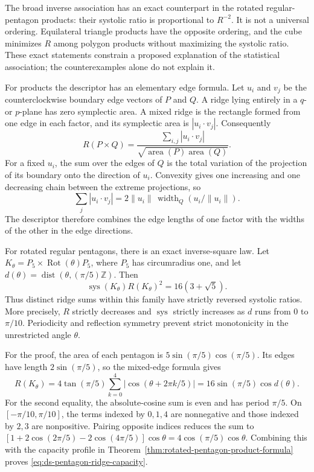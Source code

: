 The broad inverse association has an exact counterpart in the rotated
regular-pentagon products: their systolic ratio is proportional to
$R^{-2}$. It is not a universal ordering. Equilateral triangle products
have the opposite ordering, and the cube minimizes $R$ among polygon
products without maximizing the systolic ratio. These exact statements
constrain a proposed explanation of the statistical association; the
counterexamples alone do not explain it.

For products the descriptor has an elementary edge formula. Let $u_i$ and $v_j$ be
the counterclockwise boundary edge vectors of $P$ and $Q$. A ridge lying entirely in a $q$-
or $p$-plane has zero symplectic area. A mixed ridge is the rectangle formed
from one edge in each factor, and its symplectic area is $|u_i\cdot v_j|$.
Consequently
\[
 R(P\times Q)=\frac{\sum_{i,j}|u_i\cdot v_j|}
                    {\sqrt{\operatorname{area}(P)\operatorname{area}(Q)}}.
\]
For a fixed $u_i$, the sum over the edges of $Q$ is the total variation of
the projection of its boundary onto the direction of $u_i$. Convexity gives
one increasing and one decreasing chain between the extreme projections,
so
\[
 \sum_j|u_i\cdot v_j|
 =2\|u_i\|\,\operatorname{width}_Q(u_i/\|u_i\|).
\]
The descriptor therefore combines the edge lengths of one factor with the
widths of the other in the edge directions.


For rotated regular pentagons, there is an exact inverse-square law. Let
$K_\theta=P_5\times\operatorname{Rot}(\theta)P_5$, where $P_5$ has
circumradius one, and let $d(\theta)=\operatorname{dist}(\theta,(\pi/5)\mathbb Z)$.
Then
\begin{equation}\label{eq:ds-pentagon-ridge-capacity}
 \operatorname{sys}(K_\theta)R(K_\theta)^2=16(3+\sqrt5).
\end{equation}
Thus distinct ridge sums within this family have strictly reversed
systolic ratios. More precisely, $R$ strictly decreases and
$\operatorname{sys}$ strictly increases as $d$ runs from $0$ to $\pi/10$.
Periodicity and reflection symmetry prevent strict monotonicity in the
unrestricted angle $\theta$.

For the proof, the area of each pentagon is $5\sin(\pi/5)\cos(\pi/5)$.
Its edges have length $2\sin(\pi/5)$, so the mixed-edge formula gives
\[
 R(K_\theta)=4\tan(\pi/5)\sum_{k=0}^4|\cos(\theta+2\pi k/5)|
           =16\sin(\pi/5)\cos d(\theta).
\]
For the second equality, the absolute-cosine sum is even and has period
$\pi/5$. On $[-\pi/10,\pi/10]$, the terms indexed by $0,1,4$ are
nonnegative and those indexed by $2,3$ are nonpositive. Pairing opposite
indices reduces the sum to
$[1+2\cos(2\pi/5)-2\cos(4\pi/5)]\cos\theta
=4\cos(\pi/5)\cos\theta$. Combining this with the capacity profile in
Theorem~\ref{thm:rotated-pentagon-product-formula} proves
\eqref{eq:ds-pentagon-ridge-capacity}.

